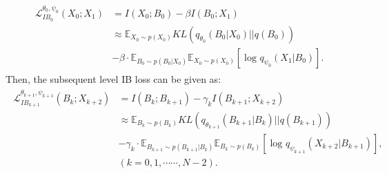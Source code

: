 \begin{align}
\begin{aligned}
\mathcal{L}_{IB_{0}}^{\theta _{0},\psi _{0} } \left ( X_{0}; X_{1} \right ) &= I\left ( X_{0}; B_{0} \right )-\beta I\left ( B_{0}; X_{1} \right )\\
&\approx \mathbb{E} _{X_{0}\sim p(X_{0}) } KL\left ( q_{\theta _{0}}\left ( B_{0}|X_{0} \right ) ||q\left ( B_{0} \right ) \right )  \\& -\beta\cdot \mathbb{E} _{B_{0}\sim p(B_{0}|X_{0})}\mathbb{E} _{X_{0}\sim p(X_{0}) }\left [ \log_{}{q_{\psi _{0} } \left ( X_{1}|B_{0}  \right )  }  \right ].
\end{aligned}
\label{C1_firstlevel}
\end{align}
Then, the subsequent level IB loss can be given as:
\begin{align}
\begin{aligned}
\mathcal{L}_{IB_{k+1}}^{\theta _{k+1},\psi _{k+1} } \left ( B_{k}; X_{k+2} \right ) &= I\left ( B_{k}; B_{k+1} \right )-\gamma_{k} I\left ( B_{k+1}; X_{k+2} \right ) \\
&\approx \mathbb{E} _{B_{k}\sim p(B_{k}) } KL\left ( q_{\theta _{k+1}}\left ( B_{k+1}|B_{k} \right ) ||q\left ( B_{k+1} \right ) \right )  \\& -\gamma_{k}\cdot \mathbb{E} _{B_{k+1}\sim p(B_{k+1}|B_{k})}\mathbb{E} _{B_{k}\sim p(B_{k}) }\left [ \log_{}{q_{\psi _{k+1} } \left ( X_{k+2}|B_{k+1}  \right )  }   \right ], \\& (k = 0,1,\cdots\cdots,N-2).
\end{aligned}
\label{C1_subseqlevel}
\end{align}